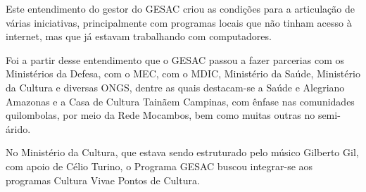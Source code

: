 \documentclass[
12pt,		%
openright,	%
twoside,  %
a4paper,			%
chapter=TITLE,		%
english,			%
french,				%
spanish,			%
brazil				%
]{USPSC-classe/USPSC}
\begin{document}
\noindent\begin{center}\mbox{\centering{}}\end{center}


Este entendimento do gestor do GESAC criou as condi\c{c}\~oes para a articula\c{c}\~ao de v\'arias iniciativas, principalmente com programas locais que n\~ao tinham acesso \`a internet, mas que j\'a estavam trabalhando com computadores.










Foi a partir desse entendimento que o GESAC passou a fazer parcerias com os Minist\'erios da Defesa, com o MEC, com o MDIC,  Minist\'erio da Sa\'ude, Minist\'erio da Cultura e diversas ONGS, dentre as quais destacam-se a \textquotedbl Sa\'ude e Alegria\textquotedbl   no Amazonas e a \textquotedbl Casa de Cultura Tain\~a\textquotedbl  em Campinas, com \^enfase nas comunidades quilombolas, por meio da Rede Mocambos, bem como muitas outras no semi-\'arido.











\noindent\begin{center}\mbox{\centering{}}\end{center}


No Minist\'erio da Cultura, que estava sendo estruturado pelo m\'usico Gilberto Gil, com apoio de C\'elio Turino, o Programa GESAC buscou integrar-se aos programas \textquotedbl Cultura Viva\textquotedbl  e \textquotedbl Pontos de Cultura\textquotedbl .
\end{document}
